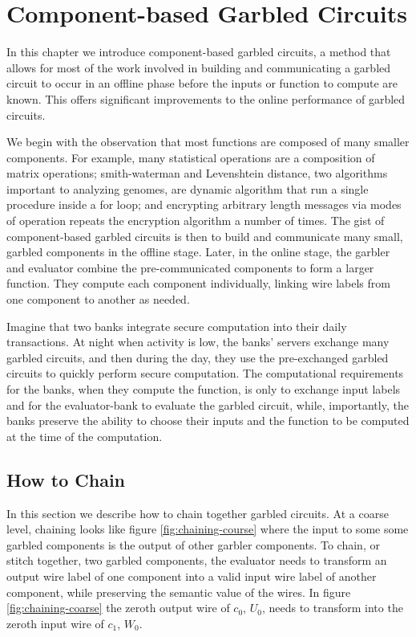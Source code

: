 
\chapter{Component-based Garbled Circuits}

In this chapter we introduce component-based garbled circuits, a method that allows for most of the work involved in building and communicating a garbled circuit to occur in an offline phase before the inputs or function to compute are known. 
This offers significant improvements to the online performance of garbled circuits. 

We begin with the observation that most functions are composed of many smaller components. 
For example, many statistical operations are a composition of matrix operations; smith-waterman and Levenshtein distance, two algorithms important to analyzing genomes, are dynamic algorithm that run a single procedure inside a for loop; and encrypting arbitrary length messages via modes of operation repeats the encryption algorithm a number of times.
The gist of component-based garbled circuits is then to build and communicate many small, garbled components in the offline stage.
Later, in the online stage, the garbler and evaluator combine the pre-communicated components to form a larger function. 
They compute each component individually, linking wire labels from one component to another as needed. 

Imagine that two banks integrate secure computation into their daily transactions.
At night when activity is low, the banks' servers exchange many garbled circuits, and then during the day, they use the pre-exchanged garbled circuits to quickly perform secure computation.
The computational requirements for the banks, when they compute the function, is only to exchange input labels and for the evaluator-bank to evaluate the garbled circuit, while, importantly, the banks preserve the ability to choose their inputs and the function to be computed at the time of the computation. 

\section{How to Chain}
In this section we describe how to chain together garbled circuits.
At a coarse level, chaining looks like figure \ref{fig:chaining-course} where the input to some some garbled components is the output of other garbler components. 
To chain, or stitch together, two garbled components, the evaluator needs to transform an output wire label of one component into a valid input wire label of another component, while preserving the semantic value of the wires. 
In figure \ref{fig:chaining-coarse} the zeroth output wire of $c_0$, $U_0$, needs to transform into the zeroth input wire of $c_1$, $W_0$. 

